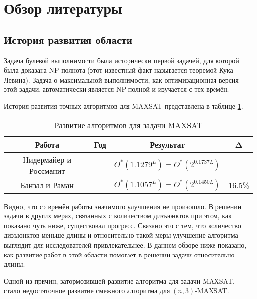 
\section{Обзор литературы}
\label{sec:literature-review}

\subsection{История развития области}
\label{subsec:literature-review:history}

\firstpar{}Задача булевой выполнимости была исторически первой задачей, для которой была доказана NP-полнота (этот известный факт называется теоремой Кука-Левина). Задача о максимальной выполнимости, как оптимизационная версия этой задачи, автоматически является NP-полной и изучается с тех времён.

История развития точных алгоритмов для MAXSAT представлена в таблице \ref{table:maxsat-length-research}.

\begin{table}[ht]
 \caption{Развитие алгоритмов для задачи MAXSAT}
 \centering
 \begin{tabular}{|c|c|c|c|}
  \hline
  \textbf{Работа} & \textbf{Год} & \textbf{Результат} & \textbf{Δ} \\
  \hline
  Нидермайер и Россманит \cite{niedermeier1999new} & \citeyear{niedermeier1999new} & $O^*(1.1279^L) = O^*(2^{0.1737L})$ & -- \\
  Банзал и Раман \cite{bansal99} & \citeyear{bansal99} & $O^*(1.1057^L) = O^*(2^{0.1450L})$ & 16.5\% \\
  \hline
 \end{tabular}
 \label{table:maxsat-length-research}
\end{table}

Видно, что со времён работы \cite{bansal99} значимого улучшения не произошло. В решении задачи в других мерах, связанных с количеством дизъюнктов при этом, как показано чуть ниже, существовал прогресс. Связано это с тем, что количество дизъюнктов меньше длины и относительно такой меры улучшение алгоритма выглядит для исследователей привлекательнее. В данном обзоре ниже показано, как развитие работ в этой области помогает в решении задачи относительно длины.

Одной из причин, затормозившей развитие алгоритма для задачи MAXSAT, стало недостаточное развитие смежного алгоритма для $(n,3)$-MAXSAT.

